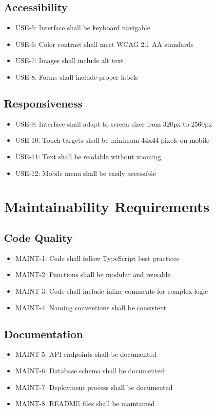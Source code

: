 \documentclass{scrreprt}
\begin{document}
\subsection{Accessibility}
\begin{itemize}
\item USE-5: Interface shall be keyboard navigable
\item USE-6: Color contrast shall meet WCAG 2.1 AA standards
\item USE-7: Images shall include alt text
\item USE-8: Forms shall include proper labels
\end{itemize}

\subsection{Responsiveness}
\begin{itemize}
\item USE-9: Interface shall adapt to screen sizes from 320px to 2560px
\item USE-10: Touch targets shall be minimum 44x44 pixels on mobile
\item USE-11: Text shall be readable without zooming
\item USE-12: Mobile menu shall be easily accessible
\end{itemize}

\section{Maintainability Requirements}

\subsection{Code Quality}
\begin{itemize}
\item MAINT-1: Code shall follow TypeScript best practices
\item MAINT-2: Functions shall be modular and reusable
\item MAINT-3: Code shall include inline comments for complex logic
\item MAINT-4: Naming conventions shall be consistent
\end{itemize}

\subsection{Documentation}
\begin{itemize}
\item MAINT-5: API endpoints shall be documented
\item MAINT-6: Database schema shall be documented
\item MAINT-7: Deployment process shall be documented
\item MAINT-8: README files shall be maintained
\end{itemize}
\end{document}
